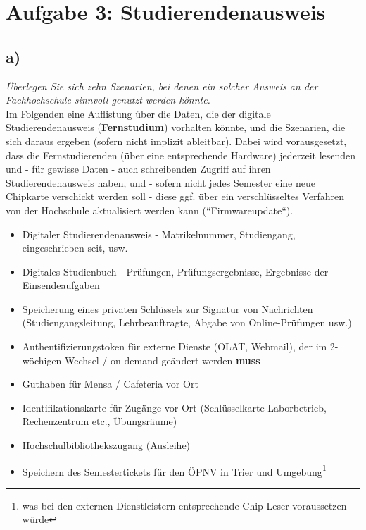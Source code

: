 \chapter{Aufgabe 3: Studierendenausweis}

\section{a)}

\textit{Überlegen Sie sich zehn Szenarien, bei denen ein solcher Ausweis an der Fachhochschule sinnvoll genutzt werden könnte.}\\

\vspace{5mm}
\noindent
Im Folgenden eine Auflistung über die Daten, die der digitale Studierendenausweis (\textbf{Fernstudium}) vorhalten könnte, und die Szenarien, die sich daraus ergeben (sofern nicht implizit ableitbar).
Dabei wird vorausgesetzt, dass die Fernstudierenden (über eine entsprechende Hardware) jederzeit lesenden und - für gewisse Daten - auch schreibenden Zugriff auf ihren Studierendenausweis haben, und - sofern nicht jedes Semester eine neue Chipkarte verschickt werden soll - diese ggf. über ein verschlüsseltes Verfahren von der Hochschule aktualisiert werden kann (``Firmwareupdate``).\\

\begin{itemize}
    \itemsep0.5em
    \item Digitaler Studierendenausweis - Matrikelnummer, Studiengang, eingeschrieben seit, usw.
    \item Digitales Studienbuch - Prüfungen, Prüfungsergebnisse, Ergebnisse der Einsendeaufgaben
    \item Speicherung eines privaten Schlüssels zur Signatur von Nachrichten (Studiengangsleitung, Lehrbeauftragte, Abgabe von Online-Prüfungen usw.)
    \item Authentifizierungstoken für externe Dienste (OLAT, Webmail), der im 2-wöchigen Wechsel / on-demand geändert werden \textbf{muss}
    \item Guthaben für Mensa / Cafeteria vor Ort
    \item Identifikationskarte für Zugänge vor Ort (Schlüsselkarte Laborbetrieb, Rechenzentrum etc., Übungsräume)
    \item Hochschulbibliothekszugang (Ausleihe)
    \item Speichern des Semestertickets für den ÖPNV in Trier und Umgebung\footnote{was bei den externen Dienstleistern entsprechende Chip-Leser voraussetzen würde}
\end{itemize}


